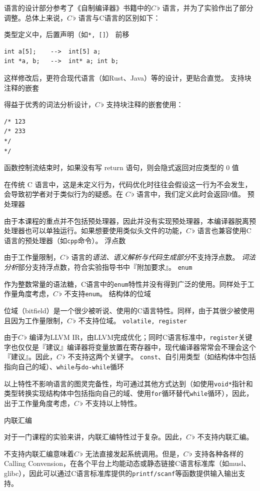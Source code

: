 \documentclass{ctexrep}
\newcommand{\cb}{$C\,\flat$\xspace}
\begin{document}
语言的设计部分参考了《自制编译器\cite{qingmufenglangZiZhiBianYiQi}》书籍中的\cb 语言，并为了实验作出了部分调整。总体上来说，\cb 语言与C语言的区别如下：
\begin{outline}[enumerate]
    \1 类型定义中，后置声明（如\texttt{*, []}） 前移
\begin{verbatim}
int a[5];    -->  int[5] a;
int *a, b;   -->  int* a; int b;
\end{verbatim}
        这样修改后，更符合现代语言（如Rust、Java）等的设计，更贴合直觉。
    \1 支持块注释的嵌套

        得益于优秀的词法分析设计，\cb 支持块注释的嵌套使用：
\begin{verbatim}
/* 123
/* 233
*/
*/
\end{verbatim}
    \1 函数控制流结束时，如果没有写 return 语句，则会隐式返回对应类型的 0 值
        
        在传统 C 语言中，这是未定义行为，代码优化时往往会假设这一行为不会发生，会导致初学者对于类似行为的疑惑。在 \cb 语言中，我们定义此时会返回0值。
    \1 预处理器

        由于本课程的重点并不包括预处理器，因此并没有实现预处理器，本编译器脱离预处理器也可以单独运行。如果想要使用类似头文件的功能，\cb 语言也兼容使用C语言的预处理器（如\texttt{cpp}命令）。
    \1 浮点数

        由于工作量限制，\cb 语言的\emph{语法、语义解析与代码生成部分}不支持浮点数。
        \emph{词法分析}部分支持浮点数，符合实验指导书中『附加要求』。
    \1 \texttt{enum}

        作为整数常量的语法糖，C语言中的\texttt{enum}特性并没有得到广泛的使用。同样处于工作量角度考虑，\cb 不支持\texttt{enum}。
    \1 结构体的位域

        位域（bitfield）是一个很少被听说、使用的C语言特性。同样，由于其很少被使用且因为工作量限制，\cb 不支持位域。
    \1 \texttt{volatile, register}

        由于\cb 编译为LLVM IR，由LLVM完成优化；同时C语言标准中，\texttt{register}关键字也仅仅是『建议』编译器将变量放置在寄存器中，现代编译器常常会不理会这个『建议』。因此，\cb 不支持这两个关键字。
    \1 \texttt{const}、自引用类型（如结构体中包括指向自己的域）、\texttt{while}与\texttt{do-while}循环
        
        以上特性不影响语言的图灵完备性，均可通过其他方式达到（如使用\texttt{void*}指针和类型转换实现结构体中包括指向自己的域、使用\texttt{for}循环替代\texttt{while}循环），因此，出于工作量角度考虑，\cb 不支持以上特性。
    
    \1 内联汇编

        对于一门课程的实验来讲，内联汇编特性过于复杂。因此，\cb 不支持内联汇编。

        不支持内联汇编意味着\cb 无法直接发起系统调用。但是，\cb 支持各种各样的Calling Convension，在各个平台上均能动态或静态链接C语言标准库（如musl、glibc），因此可以通过C语言标准库提供的\texttt{printf/scanf}等函数提供输入输出支持。
\end{outline}
\end{document}
